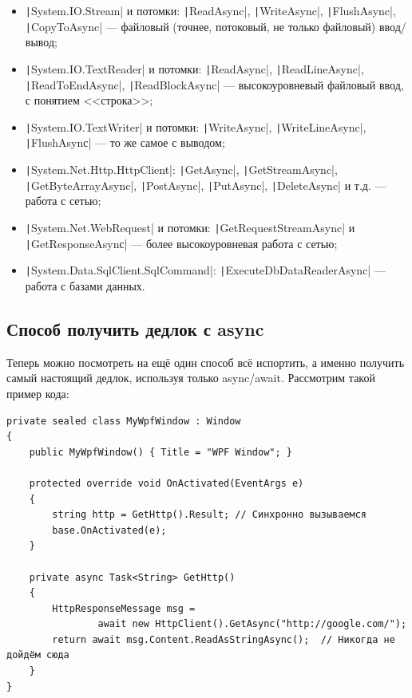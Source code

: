 \documentclass[a5paper]{article}
\begin{document}
\begin{itemize}
    \item \texttt|System.IO.Stream| и потомки: \texttt|ReadAsync|, \texttt|WriteAsync|, \texttt|FlushAsync|, \texttt|CopyToAsync| --- файловый (точнее, потоковый, не только файловый) ввод/вывод;
    \item \texttt|System.IO.TextReader| и потомки: \texttt|ReadAsync|, \texttt|ReadLineAsync|, \texttt|ReadToEndAsync|, \texttt|ReadBlockAsync| --- высокоуровневый файловый ввод, с понятием <<строка>>;
    \item \texttt|System.IO.TextWriter| и потомки: \texttt|WriteAsync|, \texttt|WriteLineAsync|, \texttt|FlushAsynс| --- то же самое с выводом;
    \item \texttt|System.Net.Http.HttpClient|: \texttt|GetAsync|, \texttt|GetStreamAsync|, \texttt|GetByteArrayAsync|, \texttt|PostAsync|, \texttt|PutAsync|, \texttt|DeleteAsync| и т.д. --- работа с сетью;
    \item \texttt|System.Net.WebRequest| и потомки: \texttt|GetRequestStreamAsync| и \texttt|GetResponseAsynс| --- более высокоуровневая работа с сетью;
    \item \texttt|System.Data.SqlClient.SqlCommand|: \texttt|ExecuteDbDataReaderAsync| --- работа с базами данных.
\end{itemize}

\subsection{Способ получить дедлок с async}

Теперь можно посмотреть на ещё один способ всё испортить, а именно получить самый настоящий дедлок, используя только async/await. Рассмотрим такой пример кода:

\begin{verbatim}
private sealed class MyWpfWindow : Window 
{
    public MyWpfWindow() { Title = "WPF Window"; }

    protected override void OnActivated(EventArgs e) 
    {
        string http = GetHttp().Result; // Синхронно вызываемся
        base.OnActivated(e);
    }

    private async Task<String> GetHttp() 
    {
        HttpResponseMessage msg = 
                await new HttpClient().GetAsync("http://google.com/");
        return await msg.Content.ReadAsStringAsync();  // Никогда не дойдём сюда
    }
}
\end{verbatim}
\end{document}
